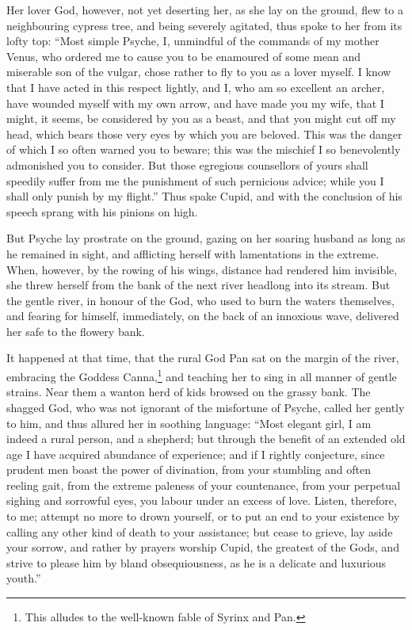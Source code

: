 \documentclass[12pt]{article}
\begin{document}
Her lover God, however, not yet deserting her, as she lay on the ground, flew
to a neighbouring cypress tree, and being severely agitated, thus spoke to her
from its lofty top: ``Most simple Psyche, I, unmindful of the commands of my
mother Venus, who ordered me to cause you to be enamoured of some mean and
miserable son of the vulgar, chose rather to fly to you as a lover myself. I
know that I have acted in this respect lightly, and I, who am so excellent an
archer, have wounded myself with my own arrow, and have made you my wife, that
I might, it seems, be considered by you as a beast, and that you might cut off
my head, which bears those very eyes by which you are beloved. This was the
danger of which I so often warned you to beware; this was the mischief I so
benevolently admonished you to consider. But those egregious counsellors of
yours shall speedily suffer from me the punishment of such pernicious advice;
while you I shall only punish by my flight.'' Thus spake Cupid, and with the
conclusion of his speech sprang with his pinions on high.

But Psyche lay prostrate on the ground, gazing on her soaring husband as long
as he remained in sight, and afflicting herself with lamentations in the
extreme. When, however, by the rowing of his wings, distance had rendered him
invisible, she threw herself from the bank of the next river headlong into its
stream. But the gentle river, in honour of the God, who used to burn the waters
themselves, and fearing for himself, immediately, on the back of an innoxious
wave, delivered her safe to the flowery bank.

It happened at that time, that the rural God Pan sat on the margin of the
river, embracing the Goddess Canna,\footnote{This alludes to the well-known
fable of Syrinx and Pan.} and teaching her to sing in all manner of gentle
strains. Near them a wanton herd of kids browsed on the grassy bank. The
shagged God, who was not ignorant of the misfortune of Psyche, called her
gently to him, and thus allured her in soothing language: ``Most elegant girl,
I am indeed a rural person, and a shepherd; but through the benefit of an
extended old age I have acquired abundance of experience; and if I rightly
conjecture, since prudent men boast the power of divination, from your
stumbling and often reeling gait, from the extreme paleness of your
countenance, from your perpetual sighing and sorrowful eyes, you labour under
an excess of love. Listen, therefore, to me; attempt no more to drown yourself,
or to put an end to your existence by calling any other kind of death to your
assistance; but cease to grieve, lay aside your sorrow, and rather by prayers
worship Cupid, the greatest of the Gods, and strive to please him by bland
obsequiousness, as he is a delicate and luxurious youth.''
\end{document}
